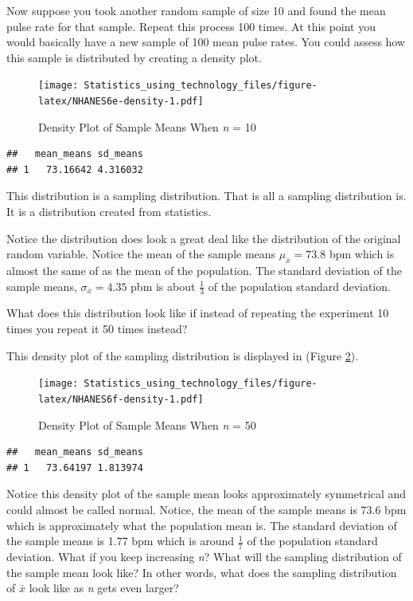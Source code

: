 \documentclass[]{book}
\begin{document}
Now suppose you took another random sample of size 10 and found the mean pulse rate for that sample. Repeat this process 100 times. At this point you would basically have a new sample of 100 mean pulse rates. You could assess how this sample is distributed by creating a density plot.



\begin{figure}
\centering
\texttt{[image: Statistics\_using\_technology\_files/figure-latex/NHANES6e-density-1.pdf]}
\caption{\label{fig:NHANES6e-density}Density Plot of Sample Means When \emph{n} = 10}
\end{figure}

\begin{verbatim}
##   mean_means sd_means
## 1   73.16642 4.316032
\end{verbatim}

This distribution is a sampling distribution. That is all a sampling distribution is. It is a distribution created from statistics.

Notice the distribution does look a great deal like the distribution of the original random variable. Notice the mean of the sample means \(\mu_{\bar{x}} = 73.8\) bpm which is almost the same of as the mean of the population. The standard deviation of the sample means, \(\sigma_{\bar{x}}=4.35\) pbm is about \(\frac{1}{3}\) of the population standard deviation.

What does this distribution look like if instead of repeating the experiment 10 times you repeat it 50 times instead?

This density plot of the sampling distribution is displayed in (Figure \ref{fig:NHANES6f-density}).



\begin{figure}
\centering
\texttt{[image: Statistics\_using\_technology\_files/figure-latex/NHANES6f-density-1.pdf]}
\caption{\label{fig:NHANES6f-density}Density Plot of Sample Means When \emph{n} = 50}
\end{figure}

\begin{verbatim}
##   mean_means sd_means
## 1   73.64197 1.813974
\end{verbatim}

Notice this density plot of the sample mean looks approximately symmetrical and could almost be called normal. Notice, the mean of the sample means is 73.6 bpm which is approximately what the population mean is. The standard deviation of the sample means is 1.77 bpm which is around \(\frac{1}{7}\) of the population standard deviation. What if you keep increasing \emph{n}? What will the sampling distribution of the sample mean look like? In other words, what does the sampling distribution of \(\bar{x}\) look like as \emph{n} gets even larger?
\end{document}
